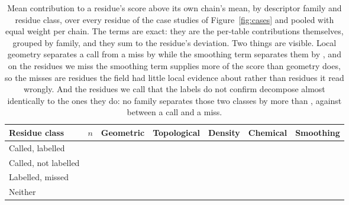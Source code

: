 \documentclass[11pt]{article}
\begin{document}
\begin{table}[t]
\centering
\caption{Mean contribution to a residue's score above its own chain's mean, by
descriptor family and residue class, over every residue of the \AudCases{} case
studies of Figure~\ref{fig:cases} and pooled with equal weight per chain. The
terms are exact: they are the per-table contributions themselves, grouped by
family, and they sum to the residue's deviation. Two things are visible. Local
geometry separates a call from a miss by \AudGeomMargin{} while the smoothing term
separates them by \AudGateMargin{}, and on the residues we miss the smoothing term
supplies more of the score than geometry does, so the misses are residues the
field had little local evidence about rather than residues it read wrongly. And
the residues we call that the labels do not confirm decompose almost identically
to the ones they do: no family separates those two classes by more than
\AudGapToFP{}, against \AudGapToMiss{} between a call and a miss.}
\label{tab:audit}
\small
\begin{tabular}{lrrrrrr}
\toprule
Residue class & $n$ & Geometric & Topological & Density & Chemical & Smoothing \\
\midrule
Called, labelled     & \AudHitN{}  & \AudHitGeom{}  & \AudHitTopo{}
                     & \AudHitDens{} & \AudHitChem{} & \AudHitGate{} \\
Called, not labelled & \AudFPN{}   & \AudFPGeom{}   & \AudFPTopo{}
                     & \AudFPDens{}  & \AudFPChem{}  & \AudFPGate{} \\
Labelled, missed     & \AudMissN{} & \AudMissGeom{} & \AudMissTopo{}
                     & \AudMissDens{} & \AudMissChem{} & \AudMissGate{} \\
Neither              & \AudRestN{} & \AudRestGeom{} & \AudRestTopo{}
                     & \AudRestDens{} & \AudRestChem{} & \AudRestGate{} \\
\bottomrule
\end{tabular}
\end{table}
\end{document}
